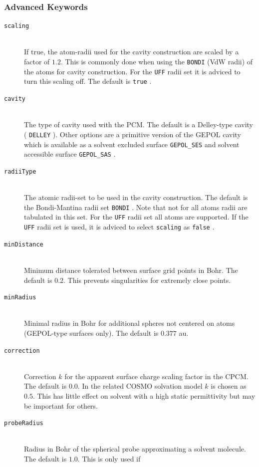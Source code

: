 \documentclass[bibliography=totocnumbered,a4paper,10pt,oneside]{scrbook}
\newcommand{\ttt}[1]{%
  \begingroup\setlength{\fboxsep}{1pt}%
  \colorbox{serenity-green!30}{\texttt{\hspace*{2pt}\vphantom{(g}#1\hspace*{2pt}}}%
  \endgroup
}
\begin{document}
\subsubsection{Advanced Keywords}
\begin{description}
    \item [\texttt{scaling}]\hfill \\
    If true, the atom-radii used for the cavity construction are scaled by a factor of $1.2$. This is commonly done 
    when using the \texttt{BONDI} (VdW radii) of the atoms for cavity construction. For the \ttt{UFF} radii set it is 
    adviced to turn this scaling off. The default is \ttt{true}.
    \item [\texttt{cavity}]\hfill \\
    The type of cavity used with the PCM. The default is a Delley-type cavity (\ttt{DELLEY}). Other options are 
    a primitive version of the GEPOL cavity which is available as a solvent excluded surface \ttt{GEPOL\_SES} and 
    solvent accessible surface \ttt{GEPOL\_SAS}.
    \item [\texttt{radiiType}]\hfill \\
    The atomic radii-set to be used in the cavity construction. The default is the Bondi-Mantina radii set \ttt{BONDI}.
    Note that not for all atoms radii are tabulated in this set. For the \ttt{UFF} radii set all atoms are supported.
    If the \texttt{UFF} radii set is used, it is adviced to select \ttt{scaling} as \ttt{false}.
    \item [\texttt{minDistance}]\hfill \\
    Minimum distance tolerated between surface grid points in Bohr. The default is $0.2$. This prevents singularities
    for extremely close points.
    \item [\texttt{minRadius}]\hfill \\
    Minimal radius in Bohr for additional spheres not centered on atoms (GEPOL-type surfaces only). The default is $0.377$ au.
    \item [\texttt{correction}]\hfill \\
    Correction $k$ for the apparent surface charge scaling factor in the CPCM. The default is $0.0$. In the related 
    COSMO solvation model $k$ is chosen as $0.5$. This has little effect on solvent with a high static permittivity
    but may be important for others.
    \item [\texttt{probeRadius}]\hfill \\
    Radius in Bohr of the spherical probe approximating a solvent molecule. The default is $1.0$. This is only used if

\end{description}
\end{document}
